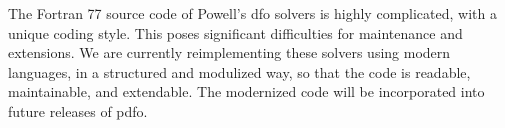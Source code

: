 The Fortran 77 source code of Powell's \gls{dfo} solvers is highly complicated, with a unique coding style.
This poses significant difficulties for maintenance and extensions.
We are currently reimplementing these solvers using modern languages, in a structured and modulized way, so that the code is readable, maintainable, and extendable.
The modernized code will be incorporated into future releases of \gls{pdfo}.
